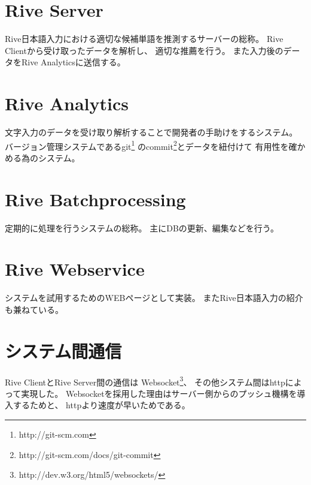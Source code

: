 \section{Rive Server}
Rive日本語入力における適切な候補単語を推測するサーバーの総称。
Rive Clientから受け取ったデータを解析し、
適切な推薦を行う。
また入力後のデータをRive Analyticsに送信する。

\section{Rive Analytics}
文字入力のデータを受け取り解析することで開発者の手助けをするシステム。
バージョン管理システムであるgit\footnote[1]{http://git-scm.com}
のcommit\footnote[2]{http://git-scm.com/docs/git-commit}とデータを紐付けて
有用性を確かめる為のシステム。

\section{Rive Batchprocessing}
定期的に処理を行うシステムの総称。
主にDBの更新、編集などを行う。

\section{Rive Webservice}
システムを試用するためのWEBページとして実装。
またRive日本語入力の紹介も兼ねている。

\section{システム間通信}
Rive ClientとRive Server間の通信は
Websocket\footnote[3]{http://dev.w3.org/html5/websockets/}、
その他システム間はhttpによって実現した。
Websocketを採用した理由はサーバー側からのプッシュ機構を導入するためと、
httpより速度が早いためである。\cite{websocket}
